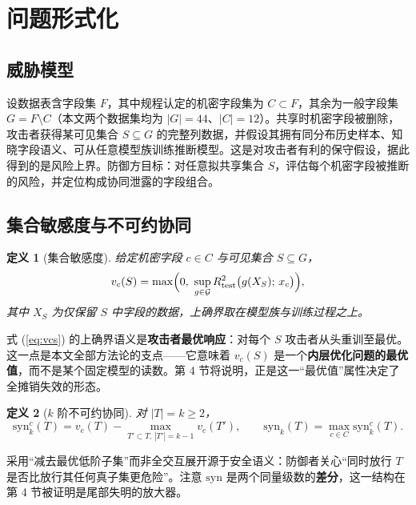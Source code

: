 \documentclass[10.5pt,compsoc,UTF8]{CjC}
\theoremstyle{mystyle}
\newtheorem{definition}{定义}
\newcommand{\syn}{\mathrm{syn}}
\newcommand{\Rtwo}{R^{2}}
\begin{document}
\section{\heiti 问题形式化}

\subsection{威胁模型}

设数据表含字段集 $F$，其中规程认定的机密字段集为 $C\subset F$，其余为一般字段集 $G=F\setminus C$（本文两个数据集均为 $|G|=44$、$|C|=12$）。共享时机密字段被删除，攻击者获得某可见集合 $S\subseteq G$ 的完整列数据，并假设其拥有同分布历史样本、知晓字段语义、可从任意模型族训练推断模型。这是对攻击者有利的保守假设，据此得到的是风险上界。防御方目标：对任意拟共享集合 $S$，评估每个机密字段被推断的风险，并定位构成协同泄露的字段组合。

\subsection{集合敏感度与不可约协同}

\begin{definition}[集合敏感度]
给定机密字段 $c\in C$ 与可见集合 $S\subseteq G$，
\begin{equation}
v_c(S)=\max\Bigl(0,\ \sup_{g\in\mathcal{G}} \Rtwo_{\mathrm{test}}\bigl(g(X_S);\,x_c\bigr)\Bigr),
\label{eq:vcs}
\end{equation}
其中 $X_S$ 为仅保留 $S$ 中字段的数据，上确界取在模型族与训练过程之上。
\end{definition}

式 (\ref{eq:vcs}) 的上确界语义是\textbf{攻击者最优响应}：对每个 $S$ 攻击者从头重训至最优。这一点是本文全部方法论的支点——它意味着 $v_c(S)$ 是一个\textbf{内层优化问题的最优值}，而不是某个固定模型的读数。第 4 节将说明，正是这一“最优值”属性决定了全摊销失效的形态。

\begin{definition}[$k$ 阶不可约协同]
对 $|T|=k\ge2$，
\begin{equation}
\syn_k^c(T)=v_c(T)-\max_{T'\subset T,\,|T'|=k-1} v_c(T'),\qquad
\syn_k(T)=\max_{c\in C}\syn_k^c(T).
\label{eq:synk}
\end{equation}
\end{definition}

采用“减去最优低阶子集”而非全交互展开源于安全语义：防御者关心“同时放行 $T$ 是否比放行其任何真子集更危险”。注意 $\syn$ 是两个同量级数的\textbf{差分}，这一结构在第 4 节被证明是尾部失明的放大器。
\end{document}
